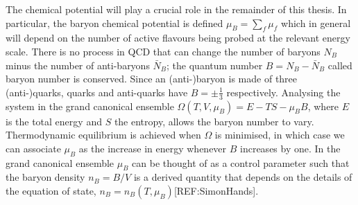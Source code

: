 \documentclass[12pt, a4paper, twoside]{book}
\newcommand{\brac}[1] {\!\left(#1\right)}
\begin{document}
The chemical potential will play a crucial role in the remainder of this thesis. In particular, the baryon chemical potential is defined \(\mu_B=\sum_f \mu_f\) which in general will depend on the number of active flavours being probed at the relevant energy scale. There is no process in QCD that can change the number of baryons \(N_B\) minus the number of anti-baryons \(\bar{N}_B\); the quantum number \(B=N_B-\bar{N}_B\) called baryon number is conserved. Since an (anti-)baryon is made of three (anti-)quarks, quarks and anti-quarks have \(B=\pm\frac{1}{3}\) respectively. Analysing the system in the grand canonical ensemble \(\Omega\brac{T,V,\mu_B}=E-TS-\mu_BB\), where \(E\) is the total energy and \(S\) the entropy, allows the baryon number to vary. Thermodynamic equilibrium is achieved when \(\Omega\) is minimised, in which case we can associate \(\mu_B\) as the increase in energy whenever \(B\) increases by one. In the grand canonical ensemble \(\mu_B\) can be thought of as a control parameter such that the baryon density \(n_B=B/V\) is a derived quantity that depends on the details of the equation of state, \(n_B=n_B\brac{T,\mu_B}\)[REF:SimonHands]. 
\end{document}
